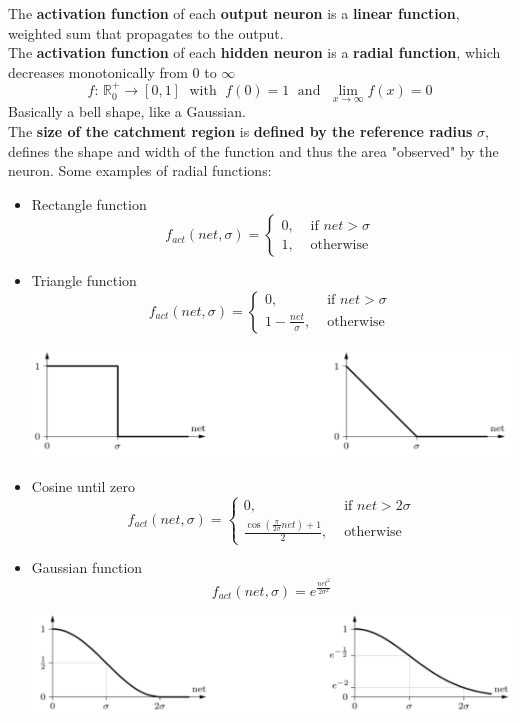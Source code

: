 \documentclass[11pt]{article}
\begin{document}
		The \textbf{activation function} of each \textbf{output neuron} is a \textbf{linear function}, weighted sum that propagates to the output.\\
		The \textbf{activation function} of each \textbf{hidden neuron} is a \textbf{radial function}, which decreases monotonically from $0$ to $\infty$
		$$ f: \, \mathbb{R}_0^+ \rightarrow [0,1] \; \text{ with } \; f(0) = 1 \; \text{ and } \; \lim_{x \rightarrow \infty} f(x) = 0 $$ 
		Basically a bell shape, like a Gaussian.\\
		The \textbf{size of the catchment region} is \textbf{defined by the reference radius} $\sigma$, defines the shape and width of the function and thus the area "observed" by the neuron. Some examples of radial functions:
		\begin{itemize}
			\item Rectangle function
			$$f_{act} (net, \sigma) = \begin{cases}
				0, & \text{ if } net > \sigma \\
				1, & \text{ otherwise }
			\end{cases} $$
			
			\item Triangle function
			$$f_{act} (net, \sigma) = \begin{cases}
				0, & \text{ if } net > \sigma \\
				1 - \frac{net}{\sigma}, & \text{ otherwise }
			\end{cases} $$
			\begin{center}
				\includegraphics[width=0.95\columnwidth]{img/NN/radial1}
			\end{center}
			
			\newpage
			
			\item Cosine until zero
			$$f_{act} (net, \sigma) = \begin{cases}
				0, & \text{ if } net > 2\sigma \\
				\frac{\cos \left(\frac{\pi}{2 \sigma} net\right) + 1}{2}, & \text{ otherwise }
			\end{cases} $$
			
			\item Gaussian function
			$$f_{act} (net, \sigma) = e^{\frac{net^2}{2 \sigma^2}} $$
			\begin{center}
				\includegraphics[width=0.95\columnwidth]{img/NN/radial2}
			\end{center}
		\end{itemize}
		
\end{document}
